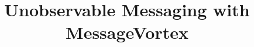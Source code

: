 \documentclass[10pt,journal,compsoc,twocolumn,twoside]{IEEEtran}
\begin{document}
%
\title{Unobservable Messaging with MessageVortex}
%
%
%
%
\end{document}
